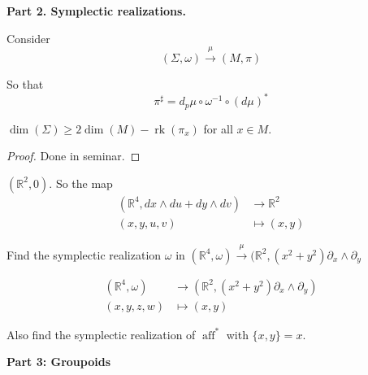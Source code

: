 \medskip\noindent
{\bf Part 2. Symplectic realizations.}

Consider
\[(\Sigma,\omega) \xrightarrow{\mu}(M,\pi)\]

So that
\[\pi ^\sharp=d_p\mu \circ \omega^{-1}
\circ(d\mu)^*\]



\begin{lemma}
\(\dim (\Sigma) \geq  2 \dim (M) -
\operatorname{rk}(\pi_x)\) for all \(x \in
M\).
\end{lemma}

\begin{proof}
Done in seminar.
\end{proof}

\begin{example}
\((\mathbb{R}^2,0)\). So the map
$$
\begin{aligned}
	(\mathbb{R}^4,dx \wedge du + dy \wedge dv)
	&\longrightarrow  \mathbb{R}^2\\
	(x,y,u,v) &\longmapsto (x,y)
\end{aligned}
$$

\end{example}

\begin{exercise}
Find the symplectic realization \(\omega\) in
\((\mathbb{R}^4, \omega )
\xrightarrow{\mu}(\mathbb{R}^2,(x^2+y^2)
\partial_x
\wedge \partial_y\)

$$
\begin{aligned}
	(\mathbb{R}^4, \omega) &\longrightarrow
	(\mathbb{R}^2,(x^2+y^2) \partial_x \wedge
	\partial _y) \\
	(x,y,z,w) &\longmapsto (x,y)
\end{aligned}
$$

Also find the symplectic realization of
\(\operatorname{ a f f }^*\) with
\(\{x,y\}=x\).
\end{exercise}

\medskip\noindent
{\bf Part 3: Groupoids}

